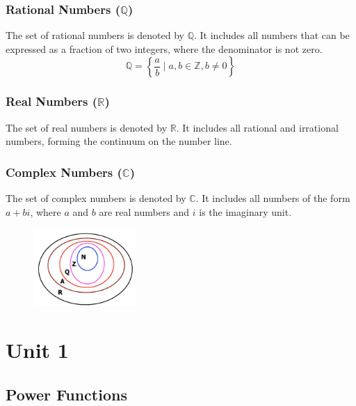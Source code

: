 \documentclass{article}
\begin{document}
\subsubsection*{Rational Numbers ($\mathbb{Q}$)}
The set of rational numbers is denoted by $\mathbb{Q}$. It includes all numbers that can be expressed as a fraction of two integers, where the denominator is not zero.
\[ \mathbb{Q} = \left\{\frac{a}{b} \mid a,b \in \mathbb{Z}, b \neq 0\right\} \]

\subsubsection*{Real Numbers ($\mathbb{R}$)}
The set of real numbers is denoted by $\mathbb{R}$. It includes all rational and irrational numbers, forming the continuum on the number line.

\subsubsection*{Complex Numbers ($\mathbb{C}$)}
The set of complex numbers is denoted by $\mathbb{C}$. It includes all numbers of the form $a + bi$, where $a$ and $b$ are real numbers and $i$ is the imaginary unit.

\begin{figure}[ht]
    \centering
    \includegraphics[width=0.35\textwidth]{imgs/number-sets-nzqar.jpg}
    \end{figure}

\newpage    
\section{Unit 1}
\subsection{Power Functions}
\end{document}
